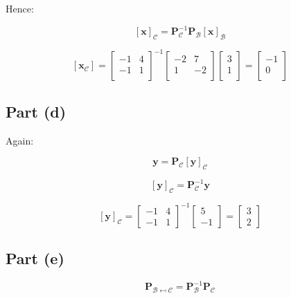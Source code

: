 \documentclass{article}
\begin{document}
Hence:

\[%
    [\mathbf{x}]_{\mathcal{C}} = \mathbf{P}_{\mathcal{C}}^{-1}
    \mathbf{P}_{\mathcal{B}} [\mathbf{x}]_{\mathcal{B}}
\]%

\[%
    [\mathbf{x}_{\mathcal{C}}] = 
    \begin{bmatrix} -1 & 4 \\ -1 & 1 \\\end{bmatrix}^{-1}
    \begin{bmatrix} -2 & 7 \\ 1 & -2 \\ \end{bmatrix}
    \begin{bmatrix} 3 \\ 1\\ \end{bmatrix}
    =
    \begin{bmatrix} -1 \\ 0 \\ \end{bmatrix}
\]%


\subsection{Part (d)} 
Again:

\[%
    \mathbf{y} = \mathbf{P}_{\mathcal{C}}[\mathbf{y}]_{\mathcal{C}}
\]%

\[%
    [\mathbf{y}]_{\mathcal{C}} = \mathbf{P}_{\mathcal{C}}^{-1}\mathbf{y}
\]%

\[%
    [\mathbf{y}]_{\mathcal{C}} =
    \begin{bmatrix}-1&4\\-1&1\end{bmatrix}^{-1}
    \begin{bmatrix}5\\-1\end{bmatrix}
    =
    \begin{bmatrix}3\\2\end{bmatrix}
\]%

\subsection{Part (e)} 

\[%
    \mathbf{P}_{\mathcal{B}\mapsfrom \mathcal{C}}
    =
    \mathbf{P}_{\mathcal{B}}^{-1} \mathbf{P}_{\mathcal{C}}
\]%
\end{document}
